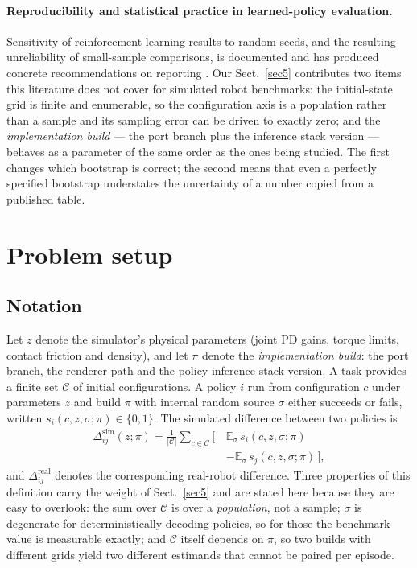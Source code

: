 \documentclass[pdflatex,iicol,sn-apa]{sn-jnl}
\theoremstyle{remark}
\begin{document}
\paragraph{Reproducibility and statistical practice in learned-policy evaluation.}
Sensitivity of reinforcement learning results to random seeds, and the resulting unreliability of
small-sample comparisons, is documented and has produced concrete recommendations on reporting
\citep{henderson2018deep, agarwal2021deep, colas2018how}. Our Sect.~\ref{sec5} contributes two items
this literature does not cover for simulated robot benchmarks: the initial-state grid is finite and
enumerable, so the configuration axis is a population rather than a sample and its sampling error
can be driven to exactly zero; and the \emph{implementation build} --- the port branch plus the
inference stack version --- behaves as a parameter of the same order as the ones being
studied. The first changes which bootstrap is correct; the second means that even a perfectly
specified bootstrap understates the uncertainty of a number copied from a published table.

\section{Problem setup}\label{sec3}

\subsection{Notation}\label{subsec3_1}

Let $z$ denote the simulator's physical parameters (joint PD gains, torque limits, contact friction
and density), and let $\pi$ denote the \emph{implementation build}: the port branch, the renderer
path and the policy inference stack version. A task provides a finite set $\mathcal{C}$ of initial
configurations. A policy $i$ run from configuration $c$ under parameters $z$ and build $\pi$ with
internal random source $\sigma$ either succeeds or fails, written
$s_i(c, z, \sigma; \pi) \in \{0,1\}$. The simulated difference between two policies is
\begin{equation}\label{eq:delta}
\begin{split}
\Delta^{\mathrm{sim}}_{ij}(z; \pi) = \frac{1}{|\mathcal{C}|} \sum_{c \in \mathcal{C}}
\big[ \, &\mathbb{E}_\sigma\, s_i(c, z, \sigma; \pi) \\[-2pt]
         &- \mathbb{E}_\sigma\, s_j(c, z, \sigma; \pi) \, \big],
\end{split}
\end{equation}
and $\Delta^{\mathrm{real}}_{ij}$ denotes the corresponding real-robot difference. Three properties
of this definition carry the weight of Sect.~\ref{sec5} and are stated here because they are easy to
overlook: the sum over $\mathcal{C}$ is over a \emph{population}, not a sample; $\sigma$ is
degenerate for deterministically decoding policies, so for those the benchmark value is measurable
exactly; and $\mathcal{C}$ itself depends on $\pi$, so two builds with different grids yield two
different estimands that cannot be paired per episode.
\end{document}
